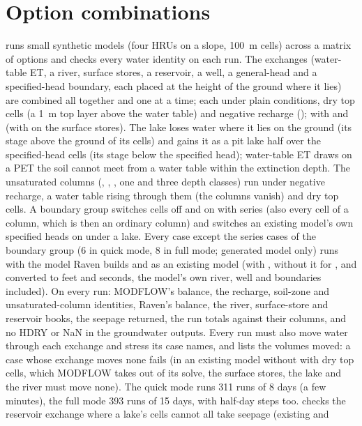 \section{Option combinations}\label{sec:vcombinations}
 runs small synthetic models (four HRUs on a slope, 100~m cells) across a matrix of options and
checks every water identity on each run. The exchanges (water-table ET, a river, surface stores, a reservoir, a well, a
general-head and a specified-head boundary, each placed at the height of the ground where it lies) are combined all
together and one at a time; each under plain conditions, dry top cells (a 1~m top layer above the water table) and
negative recharge (); with  and  (with
 on the surface stores). The lake loses water where it lies on the ground (its stage above the
ground of its cells) and gains it as a pit lake half over the specified-head cells (its stage below the specified head);
water-table ET draws on a PET the soil cannot meet from a water table within the extinction depth. The unsaturated
columns (, , , one and three depth classes) run under negative recharge, a water table
rising through them (the columns vanish) and dry top cells. A boundary group switches cells off and on with
 series (also every cell of a column, which is then an ordinary column) and switches an existing
model's own specified heads on under a lake. Every case except the  series cases of the boundary group (6 in quick mode, 8 in full mode; generated model only) runs with the model Raven builds and as an existing model (with
, without it for , and converted to feet and seconds, the model's own river, well and boundaries
included). On every run: MODFLOW's balance, the recharge, soil-zone and unsaturated-column identities, Raven's balance, the
river, surface-store and reservoir books, the seepage returned, the run totals against their columns, and no HDRY or NaN in
the groundwater outputs. Every run must also move water through each exchange and stress its case names, and lists the
volumes moved: a case whose exchange moves none fails (in an existing model without  with dry top cells, which
MODFLOW takes out of its solve, the surface stores, the lake and the river must move none). The quick mode runs 311 runs
of 8 days (a few minutes), the full mode 393 runs of 15 days, with half-day steps too.
 checks the reservoir exchange where a lake's cells cannot all take seepage (existing and
